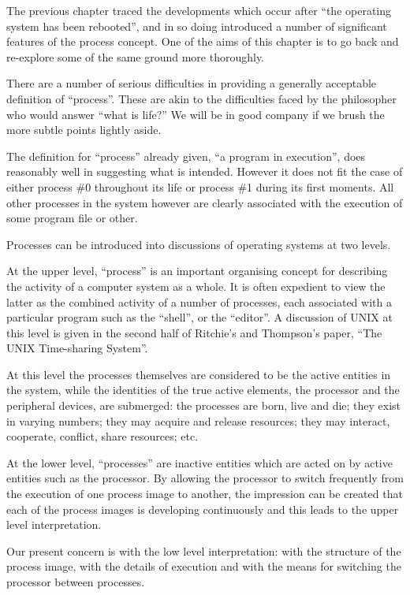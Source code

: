 %
%

The previous chapter traced the
developments which occur after ``the
operating system has been rebooted'',
and in so doing introduced a number of
significant features of the process
concept. One of the aims of this
chapter is to go back and re-explore
some of the same ground more
thoroughly.

There are a number of serious difficulties 
in providing a generally acceptable definition of ``process''. These are
akin to the difficulties faced by the
philosopher who would answer ``what is
life?'' We will be in good company if we
brush the more subtle points lightly
aside.

The definition for ``process'' already
given, ``a program in execution'', does
reasonably well in suggesting what is
intended. However it does not fit the
case of either process \#0 throughout
its life or process \#1 during its first
moments. All other processes in the
system however are clearly associated
with the execution of some program file
or other.

Processes can be introduced into discussions of operating systems at two
levels.

At the upper level, ``process'' is an
important organising concept for
describing the activity of a computer
system as a whole. It is often
expedient to view the latter as the
combined activity of a number of
processes, each associated with a particular program such as
the ``shell'', or
the ``editor''. A discussion of UNIX at
this level is given in the second half
of Ritchie's and Thompson's paper, ``The
UNIX Time-sharing System''.


At this level the processes themselves
are considered to be the active entities in the system, while the 
identities of the true active elements, the
processor and the peripheral devices,
are submerged: the processes are born,
live and die; they exist in varying
numbers; they may acquire and release
resources; they may interact,
cooperate, conflict, share resources;
etc.

At the lower level, ``processes'' are
inactive entities which are acted on by
active entities such as the processor.
By allowing the processor to switch
frequently from the execution of one
process image to another, the impression can
be created that each of the process images is
developing continuously and this leads to the upper level
interpretation.

Our present concern is with the low
level interpretation: with the structure of the process image, with the
details of execution and with the means
for switching the processor between
processes.


